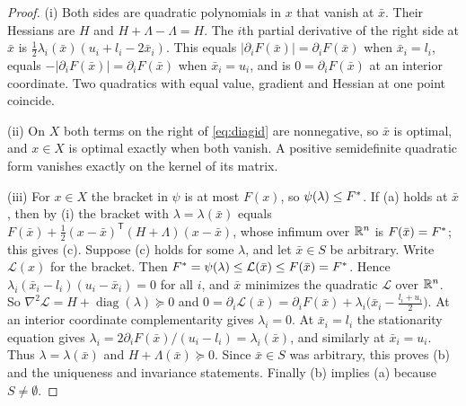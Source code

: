 \begin{proof}
(i) Both sides are quadratic polynomials in $x$ that vanish at $\bar x$.
Their Hessians are $H$ and $H+\Lambda-\Lambda=H$. The $i$th partial
derivative of the right side at $\bar x$ is
$\frac12\lambda_i(\bar x)(u_i+l_i-2\bar x_i)$. This equals
$|\partial_iF(\bar x)|=\partial_iF(\bar x)$ when $\bar x_i=l_i$, equals
$-|\partial_iF(\bar x)|=\partial_iF(\bar x)$ when $\bar x_i=u_i$, and is
$0=\partial_iF(\bar x)$ at an interior coordinate. Two quadratics with equal
value, gradient and Hessian at one point coincide.

(ii) On $X$ both terms on the right of \eqref{eq:diagid} are nonnegative,
so $\bar x$ is optimal, and $x\in X$ is optimal exactly when both vanish. A
positive semidefinite quadratic form vanishes exactly on the kernel of its
matrix.

(iii) For $x\in X$ the bracket in $\psi$ is at most $F(x)$, so
$\psi(\lambda)\le F^*$. If (a) holds at $\bar x$, then by (i) the bracket with
$\lambda=\lambda(\bar x)$ equals $F(\bar x)+\frac12(x-\bar x)^{\mathsf T}(H+\Lambda)(x-\bar x)$,
whose infimum over $\mathbb R^n$ is $F(\bar x)=F^*$; this gives (c). Suppose (c)
holds for some $\lambda$, and let $\bar x\in S$ be arbitrary. Write
$\mathcal L(x)$ for the bracket. Then
$F^*=\psi(\lambda)\le\mathcal L(\bar x)\le F(\bar x)=F^*$. Hence
$\lambda_i(\bar x_i-l_i)(u_i-\bar x_i)=0$ for all $i$, and $\bar x$ minimizes
the quadratic $\mathcal L$ over $\mathbb R^n$. So
$\nabla^2\mathcal L=H+\operatorname{diag}(\lambda)\succeq0$ and
$0=\partial_i\mathcal L(\bar x)=\partial_iF(\bar x)+\lambda_i\bigl(\bar x_i-\tfrac{l_i+u_i}2\bigr)$.
At an interior coordinate complementarity gives $\lambda_i=0$. At
$\bar x_i=l_i$ the stationarity equation gives
$\lambda_i=2\partial_iF(\bar x)/(u_i-l_i)=\lambda_i(\bar x)$, and similarly at
$\bar x_i=u_i$. Thus $\lambda=\lambda(\bar x)$ and
$H+\Lambda(\bar x)\succeq0$. Since $\bar x\in S$ was arbitrary, this proves (b)
and the uniqueness and invariance statements. Finally (b) implies (a)
because $S\ne\emptyset$.
\end{proof}

